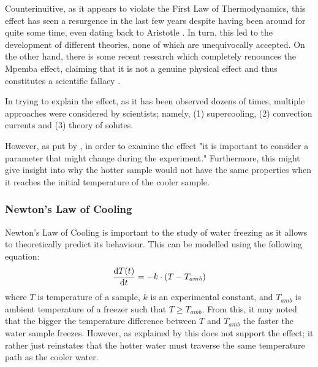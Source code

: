 \documentclass[../main.tex]{subfiles}
\begin{document}
\doublespacing

Counterinuitive, as it appears to violate the First Law of Thermodynamics, this effect has seen a resurgence in the last few years despite having been around for quite some time, even dating back to Aristotle \autocite{p._aristoteles_1962}. In turn, this led to the development of different theories, none of which are unequivocally accepted. On the other hand, there is some recent research which completely renounces the Mpemba effect, claiming that it is not a genuine physical effect and thus constitutes a scientific fallacy \autocite{burridge_questioning_2016,burridge_observing_2020}.  \par

In trying to explain the effect, as it has been observed dozens of times, multiple approaches were considered by scientists; namely, (1) supercooling, (2) convection currents and (3) theory of solutes. 


However, as put by \textcite{jeng_mpemba_2006}, in order to examine the effect "it is important to consider a parameter that might change during the experiment." Furthermore, this might give insight into why the hotter sample would not have the same properties when it reaches the initial temperature of the cooler sample. 

\subsubsection{Newton's Law of Cooling}
Newton's Law of Cooling is important to the study of water freezing as it allows to theoretically predict its behaviour. This can be modelled using the following equation:
\begin{equation}\label{eq:CoolingLawGeneral}
    \dv{T(t)}{t} = -k\cdot \left(T - T_{amb}\right)
\end{equation}
where $T$ is temperature of a sample, $k$ is an experimental constant, and $T_{amb}$ is ambient temperature of a freezer such that $T \geq T_{amb}$. From this, it may noted that the bigger the temperature difference between $T$ and $T_{amb}$ the faster the water sample freezes. However, as explained by \textcite[2]{thomas_mpemba_nodate} this does not support the effect; it rather just reinstates that the hotter water must traverse the same temperature path as the cooler water. \par
\end{document}
